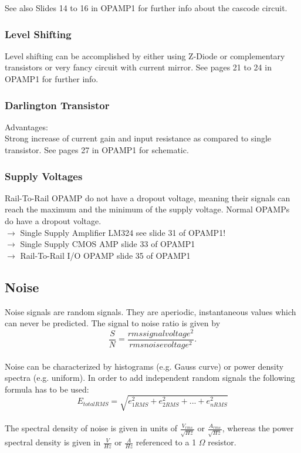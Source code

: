 			See also Slides 14 to 16 in OPAMP1 for further info about the cascode circuit. 

		\subsubsection{Level Shifting}
			Level shifting can be accomplished by either using Z-Diode or complementary transistors or very fancy circuit with current mirror. 
			See pages 21 to 24 in OPAMP1 for further info. 
			
		\subsubsection{Darlington Transistor}
			Advantages: \\
			Strong increase of current gain and input resistance as compared to single transistor. 
			See pages 27 in OPAMP1 for schematic. 
			
		\subsubsection{Supply Voltages}
			Rail-To-Rail OPAMP do not have a dropout voltage, meaning their signals can reach the maximum and the minimum of the supply voltage. Normal OPAMPs do have a dropout voltage. \\
			$\rightarrow$ Single Supply Amplifier LM324 see slide 31 of OPAMP1! \\
			$\rightarrow$ Single Supply CMOS AMP slide 33 of OPAMP1\\
			$\rightarrow$ Rail-To-Rail I/O OPAMP slide 35 of OPAMP1
	
	\subsection{Noise}
		Noise signals are random signals. They are aperiodic, instantaneous values which can never be predicted. The signal to noise ratio is given by
		\begin{equation}
			\frac{S}{N} = \frac{rms signal voltage^2}{rms noise voltage^2}.
		\end{equation}
		\\
		Noise can be characterized by histograms (e.g. Gauss curve) or power density spectra (e.g. uniform). In order to add independent random signals the following formula has to be used: 
		\begin{equation}
			E_{totalRMS} = \sqrt{e_{1RMS}^2 + e_{2RMS}^2 + ... + e_{nRMS}^2}
		\end{equation}
		\\
		The spectral density of noise is given in units of $\frac{V_{rms}}{\sqrt{Hz}}$ or $\frac{A_{rms}}{\sqrt{Hz}}$, whereas the power spectral density is given in $\frac{V}{Hz}$ or $\frac{A}{Hz}$ referenced to a 1 $\Omega$ resistor. \\

